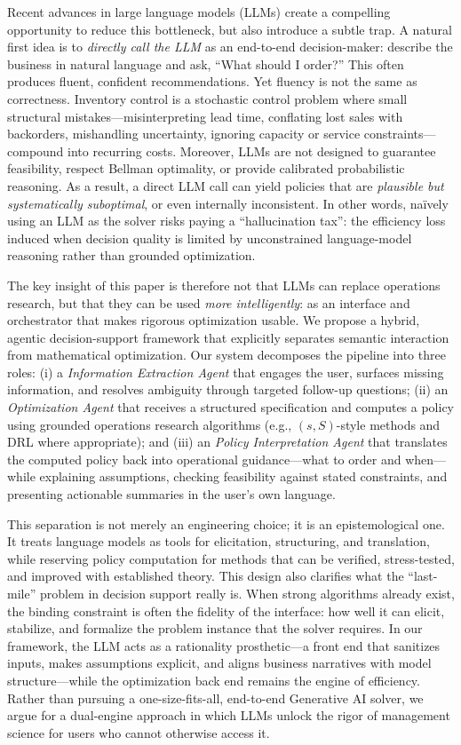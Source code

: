 \documentclass[mnsc,nonblindrev]{informs3_hide}
\begin{document}
  

Recent advances in large language models (LLMs) create a compelling opportunity to reduce this bottleneck, but also introduce a subtle trap. A natural first idea is to \emph{directly call the LLM} as an end-to-end decision-maker: describe the business in natural language and ask, “What should I order?” This often produces fluent, confident recommendations. Yet fluency is not the same as correctness. Inventory control is a stochastic control problem where small structural mistakes—misinterpreting lead time, conflating lost sales with backorders, mishandling uncertainty, ignoring capacity or service constraints—compound into recurring costs. Moreover, LLMs are not designed to guarantee feasibility, respect Bellman optimality, or provide calibrated probabilistic reasoning. As a result, a direct LLM call can yield policies that are \emph{plausible but systematically suboptimal}, or even internally inconsistent. In other words, naïvely using an LLM as the solver risks paying a “hallucination tax”: the efficiency loss induced when decision quality is limited by unconstrained language-model reasoning rather than grounded optimization.

The key insight of this paper is therefore not that LLMs can replace operations research, but that they can be used \emph{more intelligently}: as an interface and orchestrator that makes rigorous optimization usable. We propose a hybrid, agentic decision-support framework that explicitly separates semantic interaction from mathematical optimization. Our system decomposes the pipeline into three roles:
(i) a \emph{Information Extraction Agent} that engages the user, surfaces missing information, and resolves ambiguity through targeted follow-up questions;
(ii) an \emph{Optimization Agent} that receives a structured specification and computes a policy using grounded operations research algorithms (e.g., $(s,S)$-style methods and DRL where appropriate);
and (iii) an \emph{Policy Interpretation Agent} that translates the computed policy back into operational guidance—what to order and when—while explaining assumptions, checking feasibility against stated constraints, and presenting actionable summaries in the user’s own language.

This separation is not merely an engineering choice; it is an epistemological one. It treats language models as tools for elicitation, structuring, and translation, while reserving {policy computation} for methods that can be verified, stress-tested, and improved with established theory. This design also clarifies what the “last-mile” problem in decision support really is. When strong algorithms already exist, the binding constraint is often the {fidelity of the interface}: how well it can elicit, stabilize, and formalize the problem instance that the solver requires. In our framework, the LLM acts as a {rationality prosthetic}—a front end that sanitizes inputs, makes assumptions explicit, and aligns business narratives with model structure—while the optimization back end remains the engine of efficiency. Rather than pursuing a one-size-fits-all, end-to-end Generative AI solver, we argue for a dual-engine approach in which LLMs unlock the rigor of management science for users who cannot otherwise access it.
\end{document}
